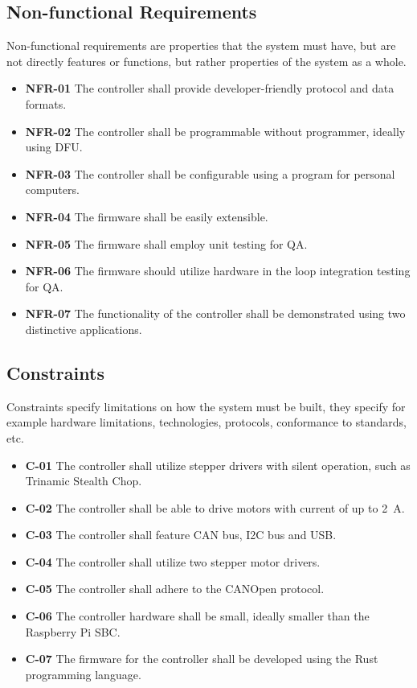 \subsection{Non-functional Requirements}
\label{subsec:nonfunc_req}
Non-functional requirements are properties that the system must have, but are not directly features or functions, but rather properties of the system as a whole.

\begin{itemize}
    \item \textbf{NFR-01} The controller shall provide developer-friendly protocol and data formats.
    \item \textbf{NFR-02} The controller shall be programmable without programmer, ideally using DFU.
    \item \textbf{NFR-03} The controller shall be configurable using a program for personal computers.
    \item \textbf{NFR-04} The firmware shall be easily extensible.
    \item \textbf{NFR-05} The firmware shall employ unit testing for QA.
    \item \textbf{NFR-06} The firmware should utilize hardware in the loop integration testing for QA.
    \item \textbf{NFR-07} The functionality of the controller shall be demonstrated using two distinctive applications.
\end{itemize}

\subsection{Constraints}
\label{subsec:constraints}
Constraints specify limitations on how the system must be built, they specify for example hardware limitations, technologies, protocols, conformance to standards, etc.

\begin{itemize}
    \item \textbf{C-01} The controller shall utilize stepper drivers with silent operation, such as Trinamic Stealth Chop.
    \item \textbf{C-02} The controller shall be able to drive motors with current of up to 2~A.
    \item \textbf{C-03} The controller shall feature CAN bus, I2C bus and USB.
    \item \textbf{C-04} The controller shall utilize two stepper motor drivers.
    \item \textbf{C-05} The controller shall adhere to the CANOpen protocol.
    \item \textbf{C-06} The controller hardware shall be small, ideally smaller than the Raspberry Pi SBC.
    \item \textbf{C-07} The firmware for the controller shall be developed using the Rust programming language.
\end{itemize}

